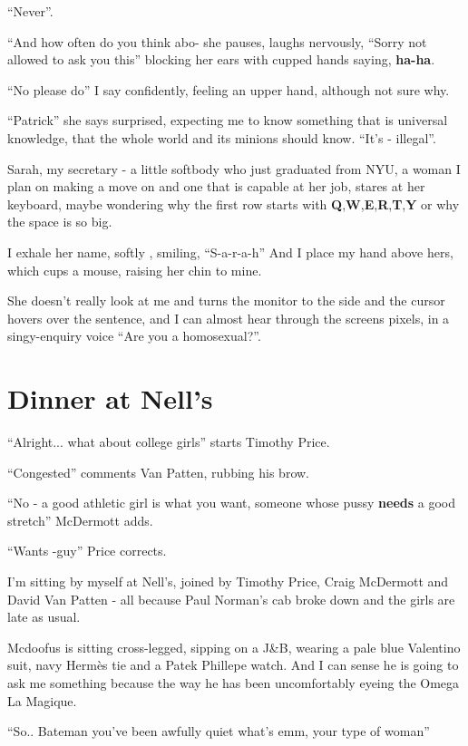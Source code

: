 \documentclass[19pt,openany]{book}
\begin{document}
``Never''.

``And how often do you think abo- she
pauses, laughs nervously, ``Sorry
not allowed to ask you this'' blocking
her ears with cupped hands
saying, \textbf{ha-ha}.

``No please do'' I say confidently,
feeling an upper hand, although not
sure why.

``Patrick'' she says surprised, expecting
me to know something that is universal
knowledge, that the whole world and
its minions should know. ``It's -
illegal''.

Sarah, my secretary - a
little softbody who
just graduated from NYU, a woman
I plan on making a move on and one that
is capable at her job, stares at her
keyboard, maybe wondering why the first
row starts with \textbf{Q},\textbf{W},\textbf{E},\textbf{R},\textbf{T},\textbf{Y} or why
the space is so big.

I exhale her name, softly , smiling, ``S-a-r-a-h''
And I place my hand above hers, which
cups a mouse, raising her chin
to mine.

She doesn't really look at me and turns
the monitor to the side and the
cursor hovers over the sentence,
and I can almost hear
through the screens pixels,
in a singy-enquiry voice ``Are
you a homosexual?''.
\chapter{Dinner at Nell's}
``Alright...
what about college girls''
starts Timothy Price.

``Congested'' comments Van Patten,
rubbing his brow.

``No - a good athletic girl
is what you want, someone
whose pussy \textbf{needs} a good
stretch'' McDermott adds.

``Wants -guy'' Price corrects.

I'm sitting by myself at Nell's,
joined by Timothy Price, Craig
McDermott and David Van Patten -
all because Paul Norman's cab
broke down and the girls are late
as usual.

Mcdoofus is sitting cross-legged,
sipping on a J\&B, wearing a pale
blue Valentino suit, navy Hermès tie
and a Patek Phillepe watch. And I can sense he
is going to ask me something because
the way he has been uncomfortably
eyeing the Omega La Magique.

``So.. Bateman you've been
awfully quiet what's
emm, your type of woman''
\end{document}

